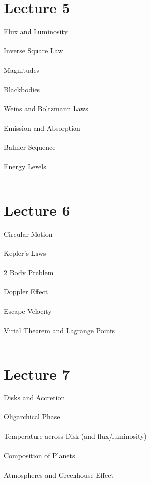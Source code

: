 \documentclass[11pt,reqno]{article}
\theoremstyle{definition}
\begin{document}
\section*{Lecture 5}
Flux and Luminosity\\\\
Inverse Square Law\\\\
Magnitudes\\\\
Blackbodies\\\\
Weins and Boltzmann Laws\\\\
Emission and Absorption\\\\
Balmer Sequence\\\\
Energy Levels\\\\

\section*{Lecture 6}
Circular Motion\\\\
Kepler's Laws\\\\
2 Body Problem\\\\
Doppler Effect\\\\
Escape Velocity\\\\
Virial Theorem and Lagrange Points\\\\

\section*{Lecture 7}
Disks and Accretion\\\\
Oligarchical Phase\\\\
Temperature across Disk (and flux/luminosity)\\\\
Composition of Planets\\\\
Atmospheres and Greenhouse Effect\\\\
\end{document}
